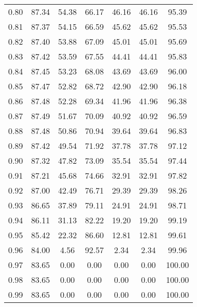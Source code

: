 \begin{tabular}{|c|c|c|c|c|c|c|}
      0.80 &     87.34 &     54.38 &      66.17 &   46.16 &      46.16 &         95.39 \\
      0.81 &     87.37 &     54.15 &      66.59 &   45.62 &      45.62 &         95.53 \\
      0.82 &     87.40 &     53.88 &      67.09 &   45.01 &      45.01 &         95.69 \\
      0.83 &     87.42 &     53.59 &      67.55 &   44.41 &      44.41 &         95.83 \\
      0.84 &     87.45 &     53.23 &      68.08 &   43.69 &      43.69 &         96.00 \\
      0.85 &     87.47 &     52.82 &      68.72 &   42.90 &      42.90 &         96.18 \\
      0.86 &     87.48 &     52.28 &      69.34 &   41.96 &      41.96 &         96.38 \\
      0.87 &     87.49 &     51.67 &      70.09 &   40.92 &      40.92 &         96.59 \\
      0.88 &     87.48 &     50.86 &      70.94 &   39.64 &      39.64 &         96.83 \\
      0.89 &     87.42 &     49.54 &      71.92 &   37.78 &      37.78 &         97.12 \\
      0.90 &     87.32 &     47.82 &      73.09 &   35.54 &      35.54 &         97.44 \\
      0.91 &     87.21 &     45.68 &      74.66 &   32.91 &      32.91 &         97.82 \\
      0.92 &     87.00 &     42.49 &      76.71 &   29.39 &      29.39 &         98.26 \\
      0.93 &     86.65 &     37.89 &      79.11 &   24.91 &      24.91 &         98.71 \\
      0.94 &     86.11 &     31.13 &      82.22 &   19.20 &      19.20 &         99.19 \\
      0.95 &     85.42 &     22.32 &      86.60 &   12.81 &      12.81 &         99.61 \\
      0.96 &     84.00 &      4.56 &      92.57 &    2.34 &       2.34 &         99.96 \\
      0.97 &     83.65 &      0.00 &       0.00 &    0.00 &       0.00 &        100.00 \\
      0.98 &     83.65 &      0.00 &       0.00 &    0.00 &       0.00 &        100.00 \\
      0.99 &     83.65 &      0.00 &       0.00 &    0.00 &       0.00 &        100.00 \\
\bottomrule
\end{tabular}
